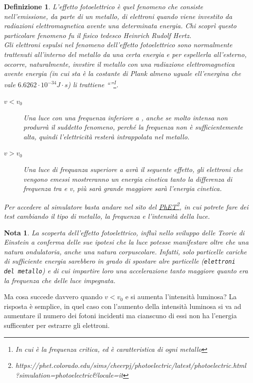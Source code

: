 \documentclass{book}
\newtheorem{defi}{Definizione}[section]
\newtheorem{nota}{Nota}[section]
\begin{document}
\begin{defi}
  L'effetto fotoelettrico è quel fenomeno che consiste nell'emissione, da parte di un metallo, di
  elettroni quando viene investito da radiazioni elettromagnetica avente una determinata energia.
  Chi scoprì questo particolare fenomeno fu il fisico tedesco Heinrich Rudolf Hertz.\\
  Gli elettroni espulsi nel fenomeno dell'effetto fotoelettrico sono normalmente trattenuti all'interno
  del metallo da una certa energia e per espellerla all'esterno, occorre, naturalmente, invstire il
  metallo con una radiazione elettromagnetica avente energia  (in cui  sta è la costante di Plank  almeno uguale ell'energina che vale $6.6262\cdot 10^{-34}J\cdot s$)
  li trattiene ``''\footnote{In cui  è la frequenza critica, ed è caratteristica di
    ogni metallo}.
  \begin{description}
  \item[$v<v_0$] Una luce con una frequenza inferiore a , anche se molto intensa non
    produrrà il suddetto fenomeno, perché la frequenza non è sufficientemente alta, quindi l'elettricità
    resterà intrappolata nel metallo.
  \item[$v>v_0$] Una luce di frequanza superiore a  avrà il seguente effetto, gli elettroni
    che vengono emessi mostreranno un energia cinetica tanto la differenza di frequenza tra  e
    v, più sarà grande maggiore sarà l'energia cinetica.
  \end{description}
  Per accedere al simulatore basta andare nel sito del \href{https://phet.colorado.edu/sims/cheerpj/photoelectric/latest/photoelectric.html?simulation=photoelectric&locale=it}{PhET}\footnote{https://phet.colorado.edu/sims/cheerpj/photoelectric/latest/photoelectric.html?simulation=photoelectric\&locale=it}, in
  cui potrete fare dei test cambiando il tipo di metallo, la frequenza e l'intensità della luce.
\end{defi}
\begin{nota}
  La scoperta dell'effetto fotoelettrico, influì nello sviluppo delle Teorie di Einstein a conferma
  delle sue ipotesi che la luce potesse manifestare oltre che una natura ondulatoria, anche una natura
  corpuscolare. Infatti, solo particelle cariche di sufficiente energia sarebbero in grado di spostare
  alre particelle (\texttt{elettroni del metallo}) e di cui impartire loro una accelerazione tanto
  maggiore quanto era la frequenza che delle luce impegnata.
\end{nota}
Ma cosa succede davvero quando $v<v_0$ e si aumenta l'intensità luminosa? La risposta è semplice,
in quel caso con l'aumento della intensità luminosa si va ad aumentare il numero dei fotoni incidenti
ma cianscuno di essi non ha l'energia sufficenter per estrarre gli elettroni.
\end{document}
